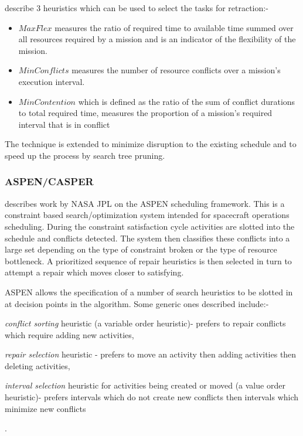 \citet{kramer03maxflex} describe 3 heuristics which can be used to select the tasks for retraction:-

\begin{itemize}
\item $MaxFlex$ measures the ratio of required time to available time summed over all resources required by a mission and is an indicator of the flexibility of the mission.
\item $MinConflicts$ \citep{minton92minconflicts} measures the number of resource conflicts over a mission's execution interval.
\item $MinContention$ which is defined as the ratio of the sum of conflict durations to total required time, measures the proportion of a mission's required interval that is in conflict
\end{itemize}
The technique is extended \citep{kramer04swapping} to minimize disruption to the existing schedule and to speed up the process by search tree pruning.





\subsubsection{ASPEN/CASPER}
\citet{rabideau99iterative} describes work by NASA JPL on the ASPEN scheduling framework. This is a constraint based search/optimization system intended for spacecraft operations scheduling. During the constraint satisfaction cycle activities are slotted into the schedule and conflicts detected. The system then classifies these conflicts into a large set depending on the type of constraint broken or the type of resource bottleneck. A prioritized sequence of repair heuristics is then selected in turn to attempt a repair which moves closer to satisfying.

 ASPEN allows the specification of a number of search heuristics to be slotted in at decision points in the algorithm. Some generic ones described include:- \begin{inparaenum} \item \emph{conflict sorting} heuristic (a variable order heuristic)- prefers to repair conflicts which require adding new activities, \item \emph{repair selection} heuristic - prefers to move an activity then adding activities then deleting activities, \item \emph{interval selection} heuristic for activities being created or moved (a value order heuristic)- prefers intervals which do not create new conflicts then intervals which minimize new conflicts \end{inparaenum}.

